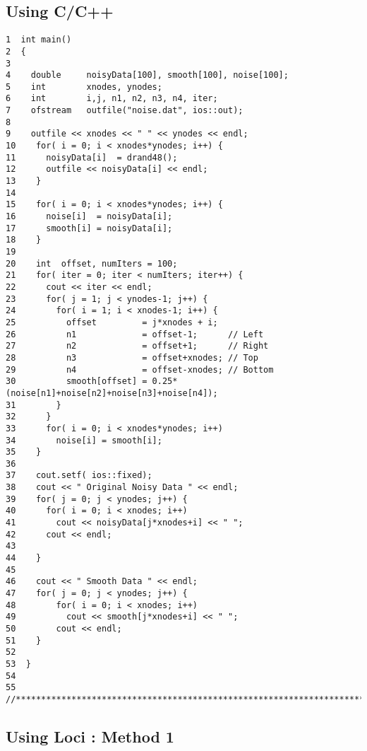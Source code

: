 \subsection { Using C/C++ }
\begin{verbatim}
1  int main()
2  {
3
4    double     noisyData[100], smooth[100], noise[100];
5    int        xnodes, ynodes;
6    int        i,j, n1, n2, n3, n4, iter;
7    ofstream   outfile("noise.dat", ios::out);
8
9    outfile << xnodes << " " << ynodes << endl;
10    for( i = 0; i < xnodes*ynodes; i++) {
11      noisyData[i]  = drand48();
12      outfile << noisyData[i] << endl;
13    }
14
15    for( i = 0; i < xnodes*ynodes; i++) {
16      noise[i]  = noisyData[i];
17      smooth[i] = noisyData[i];
18    }
19
20    int  offset, numIters = 100;
21    for( iter = 0; iter < numIters; iter++) {
22      cout << iter << endl;
23      for( j = 1; j < ynodes-1; j++) {
24        for( i = 1; i < xnodes-1; i++) {
25          offset         = j*xnodes + i;
26          n1             = offset-1;      // Left
27          n2             = offset+1;      // Right
28          n3             = offset+xnodes; // Top
29          n4             = offset-xnodes; // Bottom
30          smooth[offset] = 0.25*(noise[n1]+noise[n2]+noise[n3]+noise[n4]);
31        }
32      }
33      for( i = 0; i < xnodes*ynodes; i++)
34        noise[i] = smooth[i];
35    }
36
37    cout.setf( ios::fixed);
38    cout << " Original Noisy Data " << endl;
39    for( j = 0; j < ynodes; j++) {
40      for( i = 0; i < xnodes; i++)
41        cout << noisyData[j*xnodes+i] << " ";
42      cout << endl;
43
44    }
45
46    cout << " Smooth Data " << endl;
47    for( j = 0; j < ynodes; j++) {
48        for( i = 0; i < xnodes; i++)
49          cout << smooth[j*xnodes+i] << " ";
50        cout << endl;
51    }
52
53  }
54
55  //*********************************************************************
\end{verbatim}


\subsection{ Using Loci : Method 1}

